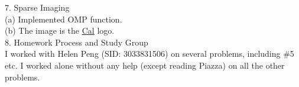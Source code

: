\documentclass{article}
\begin{document}
{\Large 7. Sparse Imaging} \\[.5cm]
{\color{red} (a) Implemented OMP function. } \\[.5cm]
{\color{red} (b)} The image is the {\color{red} \underline{Cal} logo. } \\[1cm]

{\Large 8. Homework Process and Study Group} \\

I worked with Helen Peng (SID: 3033831506) on several problems, including \#5 etc. I worked alone without any help (except reading Piazza) on all the other problems.
\end{document}
